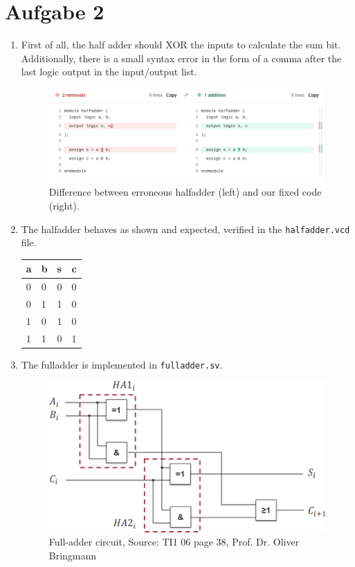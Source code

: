 \documentclass[a4paper]{scrartcl}
\begin{document}
\section*{Aufgabe 2}
\begin{enumerate}[label=(\alph*)]

\item 
First of all, the half adder should XOR the inputs to calculate the sum bit. Additionally, there is a small syntax error in the form of a comma after the last logic output in the input/output list.
\begin{figure}[h]
    \centering
    \includegraphics[width=1.0\linewidth]{halfadder-diff.png}
    \caption{Difference between erroneous halfadder (left) and our fixed code (right).}
    \label{fig:halfadder-diff}
\end{figure}

\item 
The halfadder behaves as shown and expected, verified in the \verb|halfadder.vcd| file.
\begin{table}[h]
\centering
\begin{tabular}{ll|ll}
\hline
\textbf{a} & \textbf{b} & \textbf{s} & \textbf{c} \\ \hline
0 & 0 & 0 & 0 \\
0 & 1 & 1 & 0 \\
1 & 0 & 1 & 0 \\
1 & 1 & 0 & 1 \\ \hline
\end{tabular}
\end{table}

\item 
The fulladder is implemented in \verb|fulladder.sv|.
\begin{figure}[H]
    \centering
    \includegraphics[width=0.6\linewidth]{fulladder.png}
    \caption{Full-adder circuit, Source: TI1 06 page 38, Prof. Dr. Oliver Bringmann}
    \label{fig:fulladder-circuit}
\end{figure}


\end{enumerate}
\end{document}
